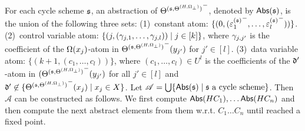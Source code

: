 For each cycle scheme ${\mathfrak{s} }$, an abstraction of ${\Theta^{({\mathfrak{s} }, \Theta^{(H,\Omega_\bot)})}}^-$, denoted by $\mathsf{Abs}({\mathfrak{s} })$,  is the union of the following three sets:
(1)~constant atom: $\{(0, ( {\varepsilon^{({\mathfrak{s} })}_{1}}^-,\dots, {\varepsilon^{({\mathfrak{s} })}_l}^-))\}$. (2)~control variable atom: $\{(j, (\gamma_{j,1},\dots, \gamma_{j,l})) \mid j \in [k]\}$, where $\gamma_{j, j'}$ is the coefficient of the $\Omega(x_j)$-atom in ${\Theta^{({\mathfrak{s} },\Theta^{(H,\Omega_\bot)})}}^-(y_{j'})$ for $j'\in[l]$. (3)~data variable atom: $\{(k+1, (c_1,\dots,c_l))\}$, where $(c_1,\dots,c_l) \in U^l$ is the coefficients of the $\mathfrak{d}'$-atom in ${(\Theta^{({\mathfrak{s} },\Theta^{(H,\Omega_\bot)})}}^-(y_{j'})$ for all $j' \in [l]$ and $\mathfrak{d}'\not\in \{{\Theta^{({\mathfrak{s} },\Theta^{(H,\Omega_\bot)})}}^-(x_j)\mid x_j\in X\}$.
Let $\mathscr{A}=\bigcup \{\mathsf{Abs}({\mathfrak{s} }) \mid {\mathfrak{s} } \mbox{ a cycle scheme}\}$. Then $\mathscr{A}$ can be constructed as follows. We first compute $\mathsf{Abs}(HC_1), \ldots \mathsf{Abs}(HC_n)$ and then compute the next abstract elements from them w.r.t. $C_1\ldots C_n$ until reached a fixed point.\\
\smallskip\\

